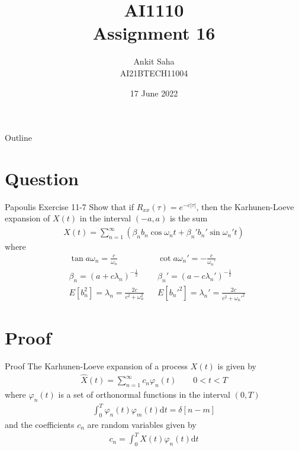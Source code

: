 \documentclass{beamer}
\title{AI1110 \\ Assignment 16}
\author{Ankit Saha \\ AI21BTECH11004}
\date{17 June 2022}
\providecommand{\brak}[1]{\ensuremath{\left(#1\right)}}
\providecommand{\abs}[1]{\left\vert#1\right\vert}
\providecommand{\mean}[1]{E\left[ #1 \right]}
\begin{document}
	\begin{frame}
		\titlepage
	\end{frame}
	
	\begin{frame}{Outline}
    		\tableofcontents
	\end{frame}
	
	\section{Question}
	\begin{frame}{Papoulis Exercise 11-7}
	Show that if $R_{xx}(\tau) = e^{-c\abs{\tau}}$, then the Karhunen-Loeve expansion of $X(t)$ in the interval $(-a,a)$ is the sum 
	\begin{align}
		\hat{X}(t) = \sum_{n=1}^{\infty} \brak{\beta_n b_n \cos \omega_n t + \beta_n' b_n' \sin \omega_n' t}
	\end{align}
	where
	\begin{align}
		&\tan a\omega_n = \frac{c}{\omega_n} && \cot a\omega_n' = -\frac{c}{\omega_n'} \\
		&\beta_n = (a + c\lambda_n)^{-\frac12} && \beta_n' = (a - c\lambda_n')^{-\frac12} \\
		&\mean{b_n^2} = \lambda_n = \frac{2c}{c^2 + \omega_n^2} && \mean{b_n'^2} = \lambda_n' = \frac{2c}{c^2 + \omega_n'^2}
	\end{align}
	\end{frame}
	
	\section{Proof}
	\begin{frame}{Proof}
	The Karhunen-Loeve expansion of a process $X(t)$ is given by
	\begin{align}
		\hat{X}(t) = \sum_{n=1}^{\infty} c_n \varphi_n(t) \qquad 0 < t < T
	\end{align}
	where $\varphi_n(t)$ is a set of orthonormal functions in the interval $(0, T)$
	\begin{align}
		\int_0^T \varphi_n(t)\varphi_m(t)\mathrm{d}t = \delta[n-m]
	\end{align}
	and the coefficients $c_n$ are random variables given by
	\begin{align}
		c_n = \int_0^T X(t)\varphi_n(t)\mathrm{d}t
	\end{align}	 
	\end{frame}
\end{document}
